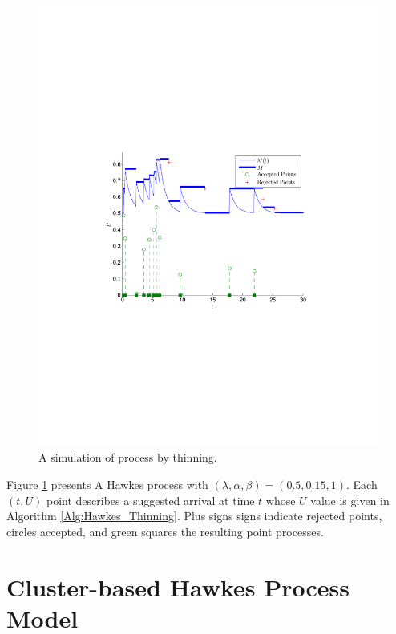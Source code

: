   \begin{figure}[H]
  	\centering
  	\includegraphics[trim = 0.8cm 8.5cm 0.8cm 8cm,clip,width=1.00\textwidth ]{Hawkess_Thinning.pdf}
  	\caption{A simulation of process by thinning.}
  	\label{Example_Thinning}
  \end{figure}
Figure \ref{Example_Thinning} presents A Hawkes process with $(\lambda, \alpha, \beta) =
(0.5, 0.15, 1)$. Each $(t, U)$ point describes a suggested arrival at time $t$ whose $U$ value
is given in Algorithm \ref{Alg:Hawkes_Thinning}. Plus signs signs indicate rejected points, circles accepted, and green squares the resulting point processes.

\section{Cluster-based Hawkes Process Model}


